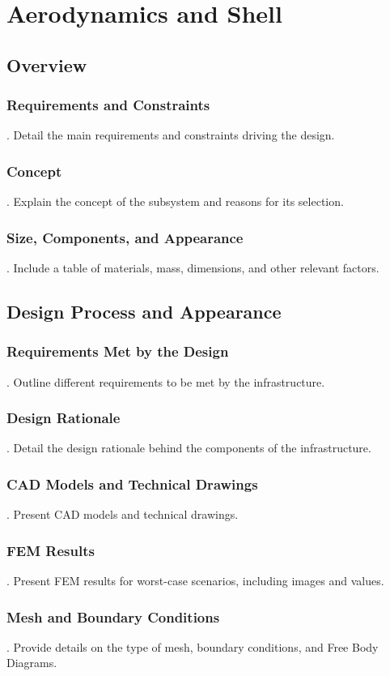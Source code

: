 \section{Aerodynamics and Shell}
\subsection{Overview}
\subsubsection{Requirements and Constraints}
.  Detail the main requirements and constraints driving the design.
\subsubsection{Concept}
.  Explain the concept of the subsystem and reasons for its selection.
\subsubsection{Size, Components, and Appearance}
.  Include a table of materials, mass, dimensions, and other relevant factors.

\subsection{Design Process and Appearance}
\subsubsection{Requirements Met by the Design}
.  Outline different requirements to be met by the infrastructure.
\subsubsection{Design Rationale}
.  Detail the design rationale behind the components of the infrastructure.
\subsubsection{CAD Models and Technical Drawings}
.  Present CAD models and technical drawings.
\subsubsection{FEM Results}
.  Present FEM results for worst-case scenarios, including images and values.
\subsubsection{Mesh and Boundary Conditions}
.  Provide details on the type of mesh, boundary conditions, and Free Body Diagrams.
